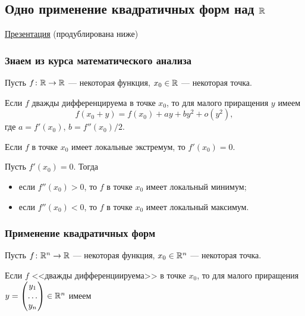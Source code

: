 \subsection{Одно применение квадратичных форм над $\mathbb{R}$}

\href{https://www.dropbox.com/s/wwv38znnuts9rld/Qforms_application.pdf?dl=0}{Презентация} (продублирована ниже)

\subsubsection{Знаем из курса математического анализа}

Пусть $f\colon \mathbb{R} \to \mathbb{R}$ --- некоторая функция, $x_0 \in \mathbb{R}$ --- некоторая точка.

Если $f$ дважды дифференцируема в точке $x_0$, то для малого приращения $y$ имеем
\begin{equation*}
    f(x_0 + y) = f(x_0) + ay + by^2 + o(y^2)
,\end{equation*}
где $a = f'(x_0)$, $b = f''(x_0) / 2$.

\begin{proposal}
    Если $f$ в точке $x_0$ имеет локальные экстремум, то $f'(x_0) = 0$.
\end{proposal}

\begin{proposal}
    Пусть $f'(x_0) = 0$. Тогда
    \begin{itemize}[nosep]
    \item если $f''(x_0) > 0$, то $f$ в точке $x_0$ имеет локальный минимум;
    \item если $f''(x_0) < 0$, то $f$ в точке $x_0$ имеет локальный максимум.
    \end{itemize}
\end{proposal}

\subsubsection{Применение квадратичных форм}

Пусть $f\colon \mathbb{R}^n \to \mathbb{R}$ --- некоторая функция, $x_0 \in \mathbb{R}^n$ --- некоторая точка.

Если $f$ <<дважды дифференциируема>> в точке $x_0$, то для малого приращения $y = \begin{pmatrix} y_1 \\ \dots \\ y_n \end{pmatrix} \in \mathbb{R}^n$ имеем

